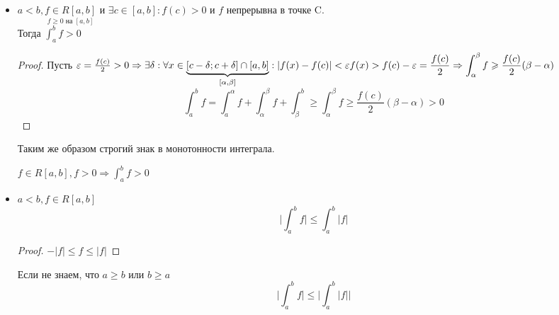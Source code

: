 \begin{itemize}
	\begin{proof}
		$\sigma_{\tau}(f) \leqslant \sigma_{\tau} (g)$
	\end{proof}

	\begin{Cons}
		$a<b, f \in R[a,b]$, если $ f \leqslant M \in \R$ на $\displaystyle [a,b], \text{ то } \int_{a}^{b} f \leqslant M(b-a), \\
		\text{ если } f \geqslant m \text{ на } [a,b] \text{то} \int_{a}^{b} f \geqslant m(b-a)$
	\end{Cons}

	\begin{Cons}
		$\displaystyle f \geqslant 0 \Rightarrow \int_{a}^{b} f \geqslant 0$
	\end{Cons}

	\item $a < b, \underset{f \geqslant 0 \text{ на } [a,b]}{f \in R[a,b]}  \text{ и } \exists c \in [a,b]: f(c)>0$ и $f$ непрерывна в точке C.\\ 
	Тогда $\displaystyle \int_{a}^{b} f > 0$

	\begin{proof}
		Пусть $\varepsilon = \frac{f(c)}{2} > 0 \Rightarrow \exists \delta: \forall x \in \underbrace{[c - \delta; c+\delta] \cap [a,b]}_{[\alpha, \beta]}:
		|f(x) - f(c)| < \varepsilon\\
		\displaystyle f(x) > f(c) - \varepsilon = \frac{f(c)}{2} \Rightarrow \int_{\alpha}^{\beta} f \geqslant \frac{f(c)}{2}(\beta - \alpha)$
		\[ \int_{a}^{b} f = \int_{a}^{\alpha} f + \int_{\alpha}^{\beta} f + \int_{\beta}^{b} \geqslant \int_{\alpha}^{\beta} f \geqslant \frac{f(c)}{2} (\beta - \alpha) > 0\]
	\end{proof}

	\begin{Rem}
		Таким же образом строгий знак в монотонности интеграла.
	\end{Rem}

	\begin{Rem}
		$\displaystyle f \in R[a,b], f > 0 \Rightarrow \int_{a}^{b} f > 0$
	\end{Rem}

	\item $a < b, f \in R[a,b]$
	\[\Big|\int_{a}^{b} f \Big| \leqslant \int_{a}^{b} |f| \]

	\begin{proof}
		$-|f| \leqslant f \leqslant |f|$ 
	\end{proof}

	Если не знаем, что $a \geqslant b \text{ или } b \geqslant a$
	\[\displaystyle \Big| \int_{a}^{b} f \Big| \leqslant \Big|\int_{a}^{b} |f|\Big| \]
\end{itemize}

